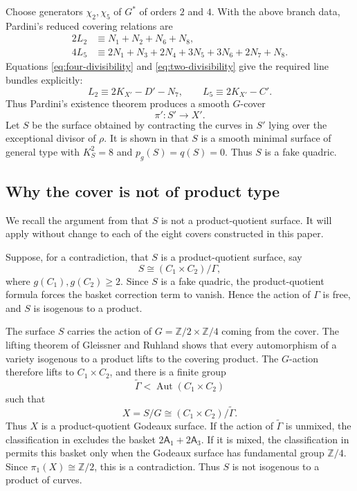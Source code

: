 \documentclass[11pt,a4paper]{article}
\newcommand{\ZZ}{\mathbb Z}
\newcommand{\Aut}{\operatorname{Aut}}
\begin{document}
Choose generators $\chi_2,\chi_5$ of $G^*$ of orders $2$ and $4$.  With the
above branch data, Pardini's reduced covering relations are
\begin{align}
  2L_2 &\equiv N_1+N_2+N_6+N_8,
       \label{eq:pardini-two}\\
  4L_5 &\equiv
       2N_1+N_3+2N_4+3N_5+3N_6+2N_7+N_8.
       \label{eq:pardini-four}
\end{align}
Equations \eqref{eq:four-divisibility} and
\eqref{eq:two-divisibility} give the required line bundles explicitly:
\begin{equation}
        L_2\equiv 2K_{X'}-D'-N_7,
        \qquad
        L_5\equiv 2K_{X'}-C'.
        \label{eq:generating-eigensheaves}
\end{equation}
Thus Pardini's existence theorem produces a smooth $G$-cover
\[
                         \pi'\colon S'\longrightarrow X'.
\]
Let $S$ be the surface obtained by contracting the curves in $S'$ lying over
the exceptional divisor of $\rho$.  It is shown in \cite{RitoExplicitFQ} that
$S$ is a smooth minimal surface of general type with
$K_S^2=8$ and $p_g(S)=q(S)=0$. Thus $S$ is a fake quadric.



\subsection{Why the cover is not of product type}
\label{subsec:not-product}

We recall the argument from \cite{RitoExplicitFQ} that $S$ is not a product-quotient surface.
It will apply without change to each of the eight covers constructed in this
paper.

Suppose, for a contradiction, that \(S\) is a product-quotient surface,
say
\[
        S\cong (C_1\times C_2)/\Gamma,
\]
where \(g(C_1),g(C_2)\geq 2\). Since \(S\) is a fake quadric, the
product-quotient formula \cite[Corollary~1.6]{BauerPignatelli12} forces
the basket correction term to vanish. Hence the action of \(\Gamma\) is
free, and \(S\) is isogenous to a product.

The surface \(S\) carries the action of
\(G=\ZZ/2\times\ZZ/4\) coming from the cover. The lifting theorem of
Gleissner and Ruhland \cite[Appendix]{RitoExplicitFQ} shows that every
automorphism of a variety isogenous to a product lifts to the covering
product. The \(G\)-action therefore lifts to \(C_1\times C_2\), and
there is a finite group
\[
        \widetilde\Gamma<\Aut(C_1\times C_2)
\]
such that
\[
        X=S/G\cong(C_1\times C_2)/\widetilde\Gamma.
\]
Thus \(X\) is a product-quotient Godeaux surface. If the action of
\(\widetilde\Gamma\) is unmixed, the classification in
\cite{BauerPignatelli12} excludes the basket
\(2\mathsf A_1+2\mathsf A_3\). If it is mixed, the classification in
\cite{FrapportiPignatelli15} permits this basket only when the Godeaux
surface has fundamental group \(\ZZ/4\). Since
\(\pi_1(X)\cong\ZZ/2\), this is a contradiction. Thus \(S\) is not
isogenous to a product of curves.
\end{document}
